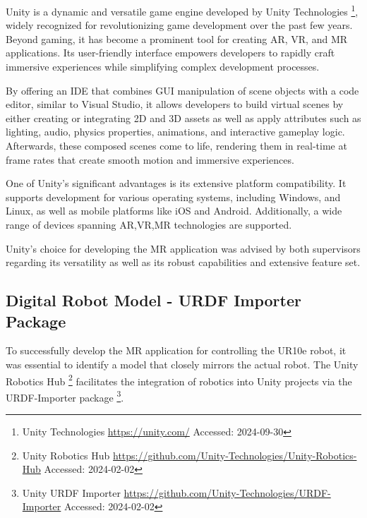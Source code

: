 Unity is a dynamic and versatile game engine developed by Unity Technologies \footnote{Unity Technologies \url{https://unity.com/} Accessed: 2024-09-30}, widely recognized for revolutionizing game development over the past few years. Beyond gaming, it has become a prominent tool for creating \ac{AR}, \ac {VR}, and \ac{MR} applications. Its user-friendly interface empowers developers to rapidly craft immersive experiences while simplifying complex development processes.

By offering an \ac{IDE} that combines \ac{GUI} manipulation of scene objects with a code editor, similar to Visual Studio, it allows developers to build virtual scenes by either creating or integrating 2D and 3D assets as well as apply attributes such as lighting, audio, physics properties, animations, and interactive gameplay logic. Afterwards, these composed scenes come to life, rendering them in real-time at frame rates that create smooth motion and immersive experiences.

One of Unity's significant advantages is its extensive platform compatibility. It supports development for various operating systems, including Windows, and Linux, as well as mobile platforms like iOS and Android. Additionally, a wide range of devices spanning \ac{AR},\ac{VR},\ac{MR} technologies are supported.

Unity's choice for developing the \ac{MR} application was advised by both supervisors regarding its versatility as well as its robust capabilities and extensive feature set.

\subsection{Digital Robot Model - URDF Importer Package}

    To successfully develop the \ac{MR} application for controlling the UR10e robot, it was essential to identify a model that closely mirrors 
    the actual robot. The Unity Robotics Hub \footnote{Unity Robotics Hub \url{https://github.com/Unity-Technologies/Unity-Robotics-Hub} 
    Accessed: 2024-02-02} facilitates the integration of robotics into Unity projects via the URDF-Importer package 
    \footnote{Unity URDF Importer \url{https://github.com/Unity-Technologies/URDF-Importer} Accessed: 2024-02-02}. 
    
